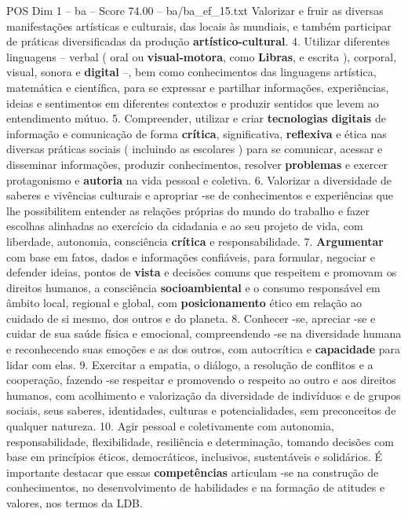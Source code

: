 \begin{textsample}{POS Dim 1 – ba – Score 74.00 – ba/ba\_ef\_15.txt}
Valorizar e fruir as diversas manifestações artísticas e culturais, das locais às mundiais, e também participar de práticas diversificadas da produção \textbf{artístico-cultural}. 4.
Utilizar diferentes linguagens – verbal ( oral ou \textbf{visual-motora}, como \textbf{Libras}, e escrita ), corporal, visual, sonora e \textbf{digital} –, bem como conhecimentos das linguagens artística, matemática e científica, para se expressar e partilhar informações, experiências, ideias e sentimentos em diferentes contextos e produzir sentidos que levem ao entendimento mútuo. 5.
Compreender, utilizar e criar \textbf{tecnologias} \textbf{digitais} de informação e comunicação de forma \textbf{crítica}, significativa, \textbf{reflexiva} e ética nas diversas práticas sociais ( incluindo as escolares ) para se comunicar, acessar e disseminar informações, produzir conhecimentos, resolver \textbf{problemas} e exercer protagonismo e \textbf{autoria} na vida pessoal e coletiva. 6.
Valorizar a diversidade de saberes e vivências culturais e apropriar -se de conhecimentos e experiências que lhe possibilitem entender as relações próprias do mundo do trabalho e fazer escolhas alinhadas ao exercício da cidadania e ao seu projeto de vida, com liberdade, autonomia, consciência \textbf{crítica} e responsabilidade. 7. \textbf{Argumentar} com base em fatos, dados e informações confiáveis, para formular, negociar e defender ideias, pontos de \textbf{vista} e decisões comuns que respeitem e promovam os direitos humanos, a consciência \textbf{socioambiental} e o consumo responsável em âmbito local, regional e global, com \textbf{posicionamento} ético em relação ao cuidado de si mesmo, dos outros e do planeta. 8.
Conhecer -se, apreciar -se e cuidar de sua saúde física e emocional, compreendendo -se na diversidade humana e reconhecendo suas emoções e as dos outros, com autocrítica e \textbf{capacidade} para lidar com elas. 9.
Exercitar a empatia, o diálogo, a resolução de conflitos e a cooperação, fazendo -se respeitar e promovendo o respeito ao outro e aos direitos humanos, com acolhimento e valorização da diversidade de indivíduos e de grupos sociais, seus saberes, identidades, culturas e potencialidades, sem preconceitos de qualquer natureza. 10.
Agir pessoal e coletivamente com autonomia, responsabilidade, flexibilidade, resiliência e determinação, tomando decisões com base em princípios éticos, democráticos, inclusivos, sustentáveis e solidários.
É importante destacar que essas \textbf{competências} articulam -se na construção de conhecimentos, no desenvolvimento de habilidades e na formação de atitudes e valores, nos termos da LDB.

\end{textsample}

